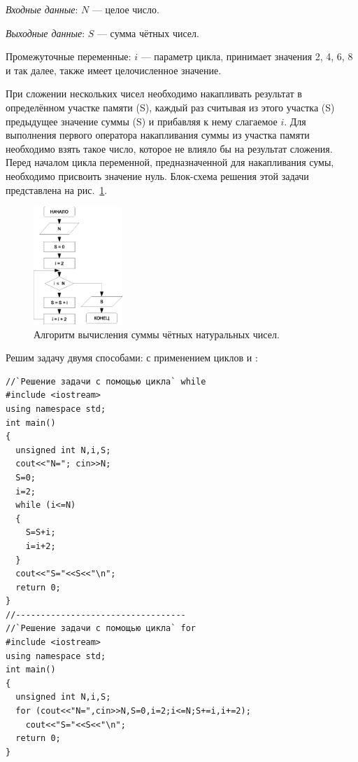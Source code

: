 
\emph{Входные данные}: $N$ --- целое число.

\emph{Выходные данные}: $S$ --- сумма чётных чисел.

Промежуточные переменные: $i$ --- параметр цикла, принимает значения  2, 4, 6, 8 и так далее, также имеет
целочисленное значение.

При сложении нескольких чисел необходимо накапливать результат в определённом участке памяти (S), каждый раз считывая из
этого участка (S) предыдущее значение суммы (S) и прибавляя к нему слагаемое $i$. Для выполнения первого оператора
накапливания суммы из участка памяти необходимо взять такое число, которое не влияло бы на результат сложения. Перед
началом цикла переменной, предназначенной для накапливания сумы, необходимо присвоить значение нуль. Блок-схема решения
этой задачи представлена на рис.~\ref{ch03:refDrawing29}.

\begin{figure}[htb]
\begin{center}
\includegraphics[width=0.3\textwidth]{img/ris_3_30}
\caption{Алгоритм вычисления суммы чётных натуральных чисел.}
\label{ch03:refDrawing29}
\end{center}
\end{figure}

Решим задачу двумя способами: с применением циклов  и :

\begin{lstlisting}
//`Решение задачи с помощью цикла` while
#include <iostream>
using namespace std;
int main()
{
  unsigned int N,i,S;
  cout<<"N="; cin>>N;
  S=0;
  i=2;
  while (i<=N)
  {
    S=S+i;
    i=i+2;
  }
  cout<<"S="<<S<<"\n";
  return 0;
}
//----------------------------------
//`Решение задачи с помощью цикла` for
#include <iostream>
using namespace std;
int main()
{
  unsigned int N,i,S;
  for (cout<<"N=",cin>>N,S=0,i=2;i<=N;S+=i,i+=2);
    cout<<"S="<<S<<"\n";
  return 0;
}
\end{lstlisting}

